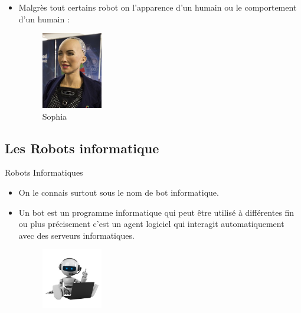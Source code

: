 \documentclass{beamer}
\begin{document}
\begin{frame}
\begin{itemize}
    \item Malgrès tout certains robot on l'apparence d'un humain ou le comportement d'un humain :
    \begin{figure}
        \centering
        \includegraphics[width=100]{img/sophia.png}
        \caption{Sophia}
        \label{fig:my_label}
    \end{figure}
    
\end{itemize}
    
\end{frame}
\subsection{Les Robots informatique}
\begin{frame}{Robots Informatiques}
\begin{itemize}
    \item On le connais surtout sous le nom de bot informatique. 
    \item Un bot est un programme informatique qui peut être utilisé à différentes fin ou plus précisement c'est un agent logiciel qui interagit automatiquement avec des serveurs informatiques.
    \begin{figure}
        \centering
        \includegraphics[width=100]{img/bot.png}
        \label{fig:my_label}
    \end{figure}
    
\end{itemize}
\end{frame}
\end{document}
